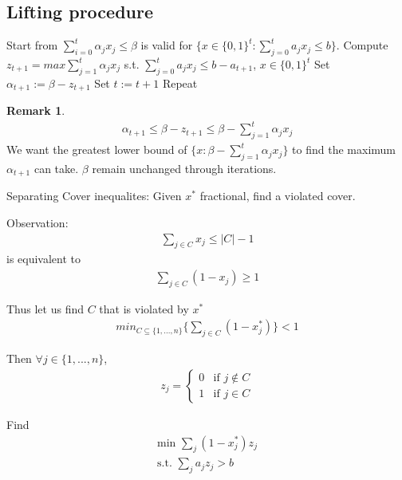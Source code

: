 \documentclass{article}
\theoremstyle{plain}
\theoremstyle{definition}
\newtheorem{rmk}{Remark}
\begin{document}
\subsection{Lifting procedure}
\begin{algorithmic}[1]
    \State  Start from $\sum_{i=0}^{t}\alpha_jx_j \leq\beta$ is valid for
        $\{x\in\{0,1\}^t: \sum_{j=0}^t a_jx_j\leq b\}$.
    \State Compute $z_{t+1} = max\sum^t_{j=1}\alpha_jx_j$ s.t.
        $\sum_{j=0}^t a_jx_j \leq b - a_{t+1}$, $x\in\{0,1\}^t$
    \State Set $\alpha_{t+1} := \beta - z_{t+1}$
    \State Set $t := t+1$
    \State Repeat
\end{algorithmic}

\begin{rmk}
    \begin{gather*}
        \alpha_{t+1}\leq\beta-z_{t+1}\leq\beta-\sum_{j=1}^t\alpha_jx_j
    \end{gather*}
    We want the greatest lower bound of $\{x: \beta-\sum^t_{j=1}\alpha_jx_j\}$ to find the
    maximum $\alpha_{t+1}$ can take. $\beta$ remain unchanged through iterations.
\end{rmk}

Separating Cover inequalites: Given $x^*$ fractional, find a violated cover.

Observation:
\begin{align*}
    \sum_{j\in C} x_j \leq |C| -1
\end{align*}
is equivalent to
\begin{gather*}
    \sum_{j\in C}(1-x_j) \geq 1
\end{gather*}

Thus let us find $C$ that is violated by $x^*$
\begin{gather*}
    min_{C\subseteq \{1,...,n\}}\{\sum_{j\in C} (1-x^*_j)\} < 1
\end{gather*}

Then $\forall j\in\{1,...,n\}$,
\begin{gather*}
    z_j =
    \begin{cases}
        0 &\text{if } j\not\in C\\
        1 &\text{if } j\in C
    \end{cases}
\end{gather*}

Find
\begin{gather*}
    \text{min } \sum_j(1-x^*_j)z_j\\
    \text{s.t. } \sum_ja_jz_j > b\\
\end{gather*}
\end{document}
